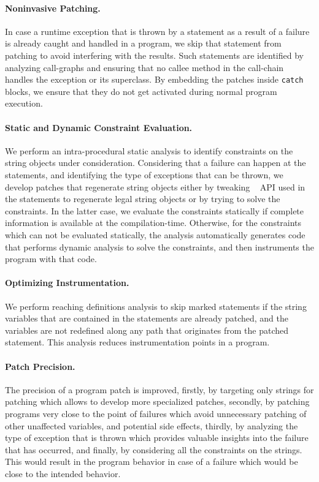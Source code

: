\paragraph{Noninvasive Patching.} In case a runtime exception that is thrown
by a statement as a result of a failure is already caught and handled in a
program,
we skip that statement from patching to avoid interfering with the results. Such
statements are identified by analyzing call-graphs and ensuring that no callee
method
in the call-chain handles the exception or its superclass. By embedding the
patches inside
\texttt{catch} blocks, we ensure that they do not get activated during normal
program execution.

\paragraph{Static and Dynamic Constraint Evaluation.} We perform an
intra-procedural static analysis
to identify constraints on the string objects under consideration. Considering
that a failure can happen
at the statements, and identifying the type of exceptions that can be thrown, we
develop patches that
regenerate string objects either by tweaking \java\  API used in
the statements to regenerate legal string objects or by trying to solve the
constraints. In the latter case,
we evaluate the constraints statically if complete information is available at
the compilation-time.
Otherwise, for the constraints which can not be evaluated statically, the
analysis automatically generates
code that performs dynamic analysis to solve the constraints, and then
instruments the program with that code.

\paragraph{Optimizing Instrumentation.} We perform reaching definitions
analysis to skip marked statements
if the string variables that are contained in the statements are already
patched, and the variables
are not redefined along any path that originates from the patched statement.
This analysis reduces
instrumentation points in a program.

\paragraph{Patch Precision.} The precision of a program patch is improved,
firstly, by targeting only strings
for patching which allows to develop more specialized patches, secondly, by
patching programs very
close to the point of failures which avoid unnecessary patching of other
unaffected variables, and potential
side effects, thirdly, by analyzing the type of exception that is thrown which
provides valuable insights into
the failure that has occurred, and finally, by considering all the constraints
on the strings. This would result
in the program behavior in case of a failure which would be close to the
intended behavior.

